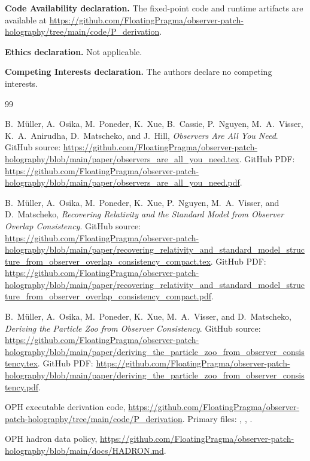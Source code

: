 \documentclass[11pt]{article}
\theoremstyle{remark}
\begin{document}
\textbf{Code Availability declaration.} The fixed-point code and runtime artifacts are available at
\url{https://github.com/FloatingPragma/observer-patch-holography/tree/main/code/P_derivation}.

\textbf{Ethics declaration.} Not applicable.

\textbf{Competing Interests declaration.} The authors declare no competing interests.

\begin{thebibliography}{99}

B.\ M\"uller, A.\ Osika, M.\ Poneder, K.\ Xue, B.\ Cassie, P.\ Nguyen, M.\ A.\ Visser, K.\ A.\ Anirudha, D.\ Matscheko, and J.\ Hill,
\emph{Observers Are All You Need}.
GitHub source:
\url{https://github.com/FloatingPragma/observer-patch-holography/blob/main/paper/observers_are_all_you_need.tex}.
GitHub PDF:
\url{https://github.com/FloatingPragma/observer-patch-holography/blob/main/paper/observers_are_all_you_need.pdf}.

B.\ M\"uller, A.\ Osika, M.\ Poneder, K.\ Xue, P.\ Nguyen, M.\ A.\ Visser, and D.\ Matscheko,
\emph{Recovering Relativity and the Standard Model from Observer Overlap Consistency}.
GitHub source:
\url{https://github.com/FloatingPragma/observer-patch-holography/blob/main/paper/recovering_relativity_and_standard_model_structure_from_observer_overlap_consistency_compact.tex}.
GitHub PDF:
\url{https://github.com/FloatingPragma/observer-patch-holography/blob/main/paper/recovering_relativity_and_standard_model_structure_from_observer_overlap_consistency_compact.pdf}.

B.\ M\"uller, A.\ Osika, M.\ Poneder, K.\ Xue, M.\ A.\ Visser, and D.\ Matscheko,
\emph{Deriving the Particle Zoo from Observer Consistency}.
GitHub source:
\url{https://github.com/FloatingPragma/observer-patch-holography/blob/main/paper/deriving_the_particle_zoo_from_observer_consistency.tex}.
GitHub PDF:
\url{https://github.com/FloatingPragma/observer-patch-holography/blob/main/paper/deriving_the_particle_zoo_from_observer_consistency.pdf}.

OPH executable derivation code,
\url{https://github.com/FloatingPragma/observer-patch-holography/tree/main/code/P_derivation}.
Primary files:
,
,
.

OPH hadron data policy,
\url{https://github.com/FloatingPragma/observer-patch-holography/blob/main/docs/HADRON.md}.


\end{thebibliography}
\end{document}

